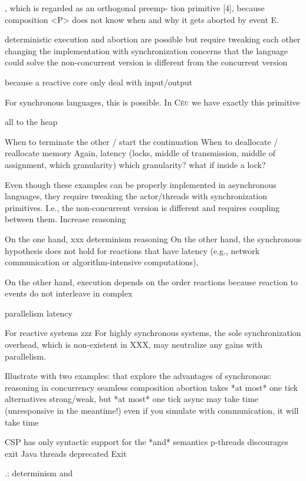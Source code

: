 \documentclass{acm_proc_article-sp}
\newcommand{\CEU}{\textsc{C\'{e}u}\xspace}
\newcommand{\1}{\;}
\newcommand{\2}{\;\;}
\newcommand{\3}{\;\;\;}
\newcommand{\5}{\;\;\;\;\;}
\begin{document}
, which is regarded as an orthogonal preemp-
tion primitive [4], because composition <P> does not know
when and why it gets aborted by event E.


deterministic execution and abortion
are possible
but require tweaking each other
changing the implementation with synchronization concerns
that the language could solve
the non-concurrent version is different from the concurrent version

because a reactive core only deal with input/output


For synchronous languages, this is possible.
In \CEU we have exactly this primitive


all to the heap

When to terminate the other / start the continuation
When to deallocate / reallocate memory
Again, latency (locks, middle of transmission, middle of assignment, which 
granularity)
which granularity? what if inside a lock?


Even though these examples can be properly implemented in asynchronous 
languages, they require tweaking the actor/threads with synchronization 
primitives.
I.e., the non-concurrent version is different and requires coupling between 
them.
Increase reasoning

On the one hand, xxx
determinism
reasoning
%
On the other hand, the synchronous hypothesis does not hold for reactions that 
have latency (e.g., network communication or algorithm-intensive computations),

On the other hand, execution depends on the order
 reactions
because reaction to events do not interleave in complex

parallelism
latency

For reactive systems zzz
For highly synchronous systems, the sole synchronization overhead, which is 
non-existent in XXX, may neutralize any gains with parallelism.

Illustrate with two examples:
that explore the advantages of synchronous:
reasoning in concurrency
seamless composition
    abortion takes *at most* one tick
    alternatives strong/weak, but *at most* one tick
    async may take time (unresponsive in the meantime!)
    even if you simulate with communication, it will take time

CSP has only syntactic support for the *and* semantics
p-threads discourages exit
Java threads deprecated Exit

                 .: determinism and
\end{document}
